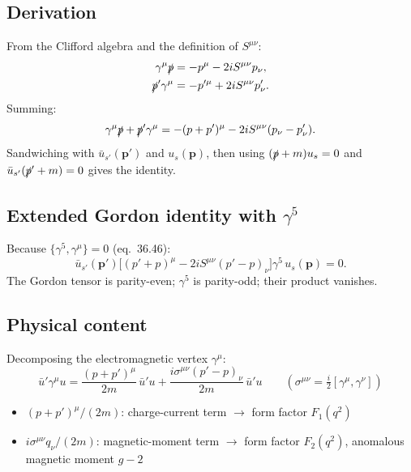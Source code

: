 \documentclass[12pt]{article}
\begin{document}
\subsection{Derivation}

From the Clifford algebra and the definition of $S^{\mu\nu}$:
\begin{align}
  \gamma^\mu\slashed{p} &= -p^\mu - 2iS^{\mu\nu}p_\nu, \\
  \slashed{p}'\gamma^\mu &= -p^{\prime\mu} + 2iS^{\mu\nu}p'_\nu.
\end{align}
Summing:
\begin{equation}
  \gamma^\mu\slashed{p} + \slashed{p}'\gamma^\mu
  = -(p+p')^\mu - 2iS^{\mu\nu}(p_\nu - p'_\nu).
\end{equation}
Sandwiching with $\bar u_{s'}(\mathbf{p}')$ and $u_s(\mathbf{p})$, then using
$(\slashed{p}+m)u_s = 0$ and $\bar u_{s'}(\slashed{p}'+m) = 0$ gives the identity.

\subsection{Extended Gordon identity with \texorpdfstring{$\gamma^5$}{gamma5}}

Because $\{\gamma^5,\gamma^\mu\} = 0$ (eq.~36.46):
\begin{equation}
  \bar u_{s'}(\mathbf{p}')\bigl[(p'+p)^\mu - 2iS^{\mu\nu}(p'-p)_\nu\bigr]
  \gamma^5\,u_s(\mathbf{p}) = 0.
  \tag{38.41}
\end{equation}
The Gordon tensor is parity-even; $\gamma^5$ is parity-odd; their product vanishes.

\subsection{Physical content}

Decomposing the electromagnetic vertex $\gamma^\mu$:
\begin{equation}
  \bar u'\gamma^\mu u
  = \frac{(p+p')^\mu}{2m}\,\bar u'u
  + \frac{i\sigma^{\mu\nu}(p'-p)_\nu}{2m}\,\bar u'u
  \qquad
  (\sigma^{\mu\nu} = \tfrac{i}{2}[\gamma^\mu,\gamma^\nu])
\end{equation}
\begin{itemize}
  \item $(p+p')^\mu/(2m)$: charge-current term $\to$ form factor $F_1(q^2)$
  \item $i\sigma^{\mu\nu}q_\nu/(2m)$: magnetic-moment term $\to$ form factor $F_2(q^2)$, anomalous magnetic moment $g{-}2$
\end{itemize}
\end{document}
